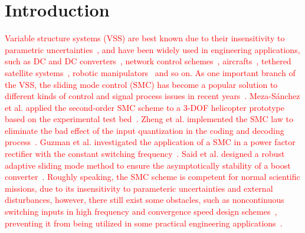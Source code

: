 \documentclass[3p]{elsarticle}
\theoremstyle{plain}
\theoremstyle{remark}
\begin{document}
\section{Introduction}
\textcolor{red}{Variable structure systems (VSS) are best known due to their insensitivity to parametric uncertainties~\cite{slotine1991applied}, and have been widely used in engineering applications, such as DC and DC converters~\cite{Tan2008General}, network control schemes~\cite{Hou2016}, aircrafts~\cite{Loza2015Sensor}, tethered satellite systems~\cite{Ma201667}, robotic manipulators~\cite{Beak2016A} and so on. As one important branch of the VSS, the sliding mode control (SMC) has become a popular solution to different kinds of control and signal process issues in recent years~\cite{zhao2015nonlinear,zhang2015attitude}. Meza-S{\'a}nchez et al. applied the second-order SMC scheme to a 3-DOF helicopter prototype based on the experimental test bed~\cite{meza2015output}. Zheng et al. implemented the SMC law to eliminate the bad effect of the input quantization in the coding and decoding process~\cite{zheng2016sliding}. Guzman et al. investigated the application of a SMC in a power factor rectifier with the constant switching frequency~\cite{guzman2016sliding}. Said et al. designed a robust adaptive sliding mode method to ensure the asymptotically stability of a boost converter~\cite{oucheriah2013pwm}. Roughly speaking, the SMC scheme is competent for normal scientific missions, due to its insensitivity to parameteric uncertainties and external disturbances, however, there still exist some obstacles, such as noncontinuous switching inputs in high frequency and convergence speed design schemes~\cite{boiko2013chattering,lee2009chattering}, preventing it from being utilized in some practical engineering applications~\cite{fridman2011sliding}.}
\end{document}
